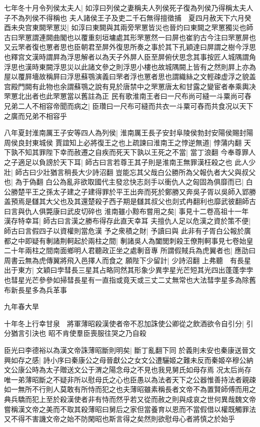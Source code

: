 七年冬十月令列侯太夫人|{
	如淳曰列侯之妻稱夫人列侯死子復為列侯乃得稱太夫人子不為列侯不得稱也}
夫人諸侯王子及吏二千石無得擅徵捕　夏四月赦天下六月癸酉未央宫東闕罘罳災|{
	如淳曰東闕與其兩旁罘罳皆災也晉灼曰東闕之罘罳獨災也師古曰罘罳謂連闕曲閣也以覆重刻垣墉處其形罘罳然一曰屏也崔豹古今注曰罘罳屏也又云罘者復也罳者思也臣朝君至屏外復思所奏之事於其下孔穎達曰屏謂之樹今浮思也釋宫文漢時謂屛為浮思解者以為天子外屏人臣至屏俯伏思念其事按匠人城隅謂角浮思也漢時東闕浮思災以此諸文參之則浮思小樓也故城隅闕上皆有之然則屛上亦為屋以覆屛墻故稱屛曰浮思蘇鶚演義曰罘者浮也罳者思也謂織絲之文輕疎虚浮之貌盖宫殿門闕有此物也余謂蘇鶚之說有見於唐禁中之罘罳唐太和甘露之變宦者奉乘輿决罘罳北出者也此罘罳當以舊註為正}
民有歌淮南王者曰一尺布尚可縫一斗粟尚可舂兄弟二人不相容帝聞而病之|{
	臣瓚曰一尺布可縫而共衣一斗粟可舂而共食况以天下之廣而兄弟不相容乎}


八年夏封淮南厲王子安等四人為列侯|{
	淮南厲王長子安封阜陵侯勃封安陽侯賜封陽周侯良封東城侯}
賈誼知上必將復王之也上疏諫曰淮南王之悖逆無道|{
	悖蒲内翻}
天下孰不知其罪陛下幸而赦遷之自疾而死天下孰以王死之不當|{
	當丁浪翻}
今奉尊罪人之子適足以負謗於天下耳|{
	師古曰言若尊王其子則是淮南王無罪漢枉殺之也}
此人少壯|{
	師古曰少壯猶言稍長大少詩沼翻}
豈能忘其父哉白公勝所為父報仇者大父與叔父也|{
	為于偽翻}
白公為亂非欲取國代主發忿快志剡手以衝仇人之匈固為俱靡而已|{
	白公勝楚平王之孫太子建之子建得罪於平王出奔而死於鄭勝又奔吳子胥以吳師入郢勝盖預焉是讎其大父也及其還楚殺子西子期是讎其叔父也剡式冉翻利也靡武彼翻師古曰言與仇人俱斃康曰武皮切碎也}
淮南雖小黥布嘗用之矣|{
	事見十二卷高祖十一年}
漢存特幸耳|{
	師古曰言漢之勝布得存此直天幸耳}
夫擅仇人足以危漢之資於策不便|{
	師古曰言假四子以資權則當危漢}
予之衆積之財|{
	予讀曰與}
此非有子胥白公報於廣都之中即疑有剸諸荆軻起於兩柱之間|{
	剸諸吳人為闔閭刺殺王僚荆軻事見七卷始皇二十年兩柱之間南面鄉明人君聽政正坐之處剸音專}
所謂假賊兵為虎翼者也|{
	應劭曰周書云無為虎傳翼將飛入邑擇人而食之}
願陛下少留計|{
	少詩沼翻}
上弗聽　有長星出于東方|{
	文穎曰孛彗長三星其占略同然其形象少異孛星光芒短其光四出蓬蓬孛孛也彗星光芒參參如掃彗長星有一直指或竟天或三丈二丈無常也大法彗孛星多為除舊布新長星多為兵革事}


九年春大旱

十年冬上行幸甘泉　將軍薄昭殺漢使者帝不忍加誅使公卿從之飲酒欲令自引分|{
	引分猶言引決也}
昭不肯使羣臣喪服往哭之乃自殺

臣光曰李德裕以為漢文帝誅薄昭斷則明矣|{
	斷丁亂翻下同}
於義則未安也秦康送晉文興如存之感|{
	詩小序曰秦康公之母晉獻公之女文公遭驪姬之難未反而秦姬卒穆公納文公康公時為太子贈送文公于渭之陽念母之不見也我見舅氏如母存焉}
况太后尚存唯一弟薄昭斷之不疑非所以慰母氏之心也臣愚以為法者天下之公器惟善持法者親疎如一無所不行則人莫敢有所恃而犯之也夫薄昭雖素稱長者文帝不為置賢師傅而用之典兵驕而犯上至於殺漢使者非有恃而然乎若又從而赦之則與成哀之世何異哉魏文帝嘗稱漢文帝之美而不取其殺薄昭曰舅后之家但當養育以恩而不當假借以權既觸罪法又不得不害譏文帝之始不防閑昭也斯言得之矣然則欲慰母心者將慎之於始乎

